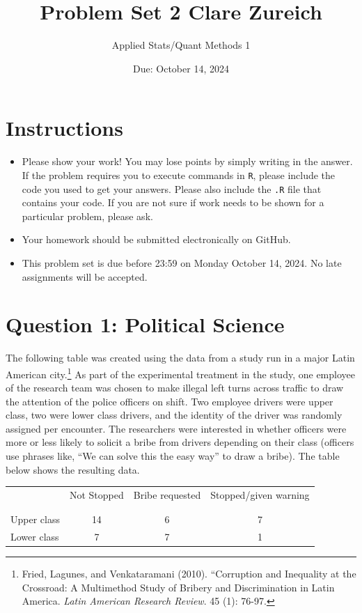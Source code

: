 \documentclass[12pt,letterpaper]{article}
\title{Problem Set 2 Clare Zureich}
\date{Due: October 14, 2024}
\author{Applied Stats/Quant Methods 1}
\begin{document}
	\maketitle
	\section*{Instructions}
\begin{itemize}
	\item Please show your work! You may lose points by simply writing in the answer. If the problem requires you to execute commands in \texttt{R}, please include the code you used to get your answers. Please also include the \texttt{.R} file that contains your code. If you are not sure if work needs to be shown for a particular problem, please ask.
	\item Your homework should be submitted electronically on GitHub.
	\item This problem set is due before 23:59 on Monday October 14, 2024. No late assignments will be accepted.

\end{itemize}

	
	\vspace{.5cm}
	\section*{Question 1: Political Science}
		\vspace{.25cm}
	The following table was created using the data from a study run in a major Latin American city.\footnote{Fried, Lagunes, and Venkataramani (2010). ``Corruption and Inequality at the Crossroad: A Multimethod Study of Bribery and Discrimination in Latin America. \textit{Latin American Research Review}. 45 (1): 76-97.} As part of the experimental treatment in the study, one employee of the research team was chosen to make illegal left turns across traffic to draw the attention of the police officers on shift. Two employee drivers were upper class, two were lower class drivers, and the identity of the driver was randomly assigned per encounter. The researchers were interested in whether officers were more or less likely to solicit a bribe from drivers depending on their class (officers use phrases like, ``We can solve this the easy way'' to draw a bribe). The table below shows the resulting data.

\newpage
\begin{table}[h!]
	\centering
	\begin{tabular}{l | c c c }
		& Not Stopped & Bribe requested & Stopped/given warning \\
		\\[-1.8ex] 
		\hline \\[-1.8ex]
		Upper class & 14 & 6 & 7 \\
		Lower class & 7 & 7 & 1 \\
		\hline
	\end{tabular}
\end{table}
\end{document}
